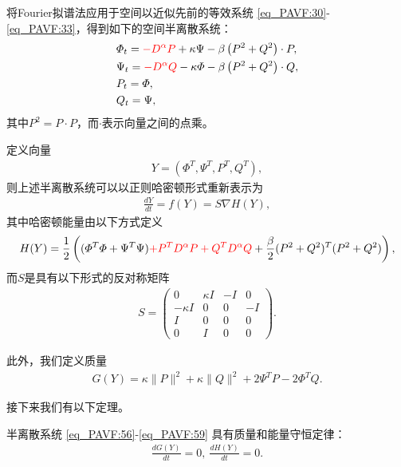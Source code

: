 将Fourier拟谱法应用于空间以近似先前的等效系统 \eqref{eq_PAVF:30}-\eqref{eq_PAVF:33}，得到如下的空间半离散系统：
\begin{align}
&\varPhi_{t}=\textcolor[rgb]{1.00,0.00,0.00}{-D^{\alpha}P}+\kappa \Psi-\beta \left( P^{2}+Q^{2}\right)\cdot P,\label{eq_PAVF:56}\\
&\Psi_{t}=\textcolor[rgb]{1.00,0.00,0.00}{-D^{\alpha}Q}-\kappa \varPhi-\beta \left( P^{2}+Q^{2}\right)\cdot Q,\label{eq_PAVF:57}\\
&P_t=\varPhi,\label{eq_PAVF:58}\\
&Q_t=\Psi,\label{eq_PAVF:59}
\end{align}
其中$P^{2}=P \cdot P$，而$\cdot$表示向量之间的点乘。

定义向量
\begin{align}\label{eq_PAVF:60a}
Y=\left(\varPhi^{T}, \Psi^{T}, P^{T}, Q^{T}\right),
\end{align}
则上述半离散系统可以以正则哈密顿形式重新表示为
\begin{align}\label{eq_PAVF:60}
\frac{d Y}{d t}=f(Y)=S \nabla H(Y),
\end{align}
其中哈密顿能量由以下方式定义
\begin{align}\label{eq_PAVF:61}
	H(Y)=\frac{1}{2}\left((\varPhi^{T}\varPhi+\Psi^{T}\Psi)\textcolor[rgb]{1.00,0.00,0.00}{+P^{T} D^{\alpha} P+Q^{T} D^{\alpha} Q}+\frac{\beta}{2}(P^2+Q^2)^{T}(P^2+Q^2)\right),
\end{align}
而$S$是具有以下形式的反对称矩阵
\begin{align}\label{eq_PAVF:62}
S=\left(\begin{array}{cccc}
0 & \kappa I & -I & 0 \\
-\kappa I & 0 & 0 & -I \\
I & 0 & 0 & 0 \\
0 & I & 0 & 0
\end{array}\right).
\end{align}

此外，我们定义质量
\begin{align}\label{eq_PAVF:63}
G(Y)=\kappa\|P\|^{2}+\kappa\|Q\|^{2} +2\Psi^{T}P-2\varPhi^{T}Q.
\end{align}

接下来我们有以下定理。

\begin{theorem}	\label{thm_PAVF:3}
	半离散系统 \eqref{eq_PAVF:56}-\eqref{eq_PAVF:59} 具有质量和能量守恒定律：
\begin{align}
\frac{d G(Y)}{d t}=0,~\frac{d H(Y)}{d t}=0.
\end{align}
\end{theorem}

